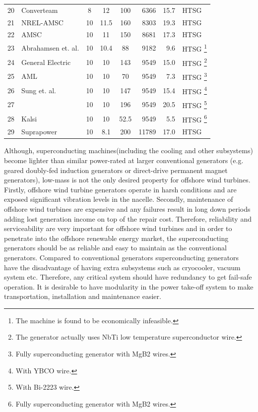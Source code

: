 \documentclass[12pt]{iopart}
\begin{document}
\begin{table}[]
\begin{minipage}{\textwidth}
\begin{tabular}{llcccrrl}
20 & Converteam \cite{Lewis2007} & 8 & 12 & 100 & 6366 & 15.7 & HTSG  \\
21 & NREL-AMSC \cite{Maples2010} & 10 & 11.5 & 160 & 8303 & 19.3 & HTSG  \\
22 & AMSC \cite{Snitchler2010} & 10 & 11 & 150 & 8681 & 17.3 & HTSG  \\
23 & Abrahamsen et. al. \cite{Abrahamsen2010}& 10 & 10.4 & 88 & 9182 & 9.6 & HTSG \footnote{The machine is found to be economically infeasible.} \\
24 & General Electric \cite{Fair2012} & 10 & 10 & 143 & 9549 & 15.0 & HTSG \footnote{The generator actually uses NbTi low temperature superconductor wire.} \\
25 & AML \cite{Masson2011} & 10 & 10 & 70 & 9549 & 7.3 & HTSG \footnote{Fully superconducting generator with MgB2 wires.} \\
26 & Sung et. al. \cite{Sung2013} & 10 & 10 & 147 & 9549 & 15.4 & HTSG \footnote{With YBCO wire.} \\
27 & & 10 & 10 & 196 & 9549 & 20.5 & HTSG \footnote{With Bi-2223 wire.} \\
28 & Kalsi \cite{Kalsi2013} & 10 & 10 & 52.5 & 9549 & 5.5 & HTSG \footnote{Fully superconducting generator with MgB2 wires.} \\
29 & Suprapower \cite{Sanz2014} & 10 & 8.1 & 200 & 11789 & 17.0 & HTSG \\
\hline
\end{tabular}
\end{minipage}
\end{table}

Although, superconducting machines(including the cooling and other subsystems) become lighter than similar power-rated at larger  conventional generators (e.g. geared doubly-fed induction generators or direct-drive permanent magnet generators), low-mass is not the only desired property for offshore wind turbines. Firstly, offshore wind turbine generators operate in harsh conditions and are exposed significant vibration levels in the nacelle. Secondly, maintenance of offshore wind turbines are expensive and any failures result in long down periods adding lost generation income on top of the repair cost. Therefore, reliability and serviceability are very important for offshore wind turbines and in order to penetrate into the offshore renewable energy market, the superconducting generators should be as reliable and easy to maintain as the conventional generators. 
Compared to conventional generators superconducting generators have the disadvantage of having extra subsystems such as cryocooler, vacuum system etc. Therefore, any critical system should have redundancy to get fail-safe operation. It is desirable to have modularity in the power take-off system to make transportation, installation and maintenance easier.
\end{document}
